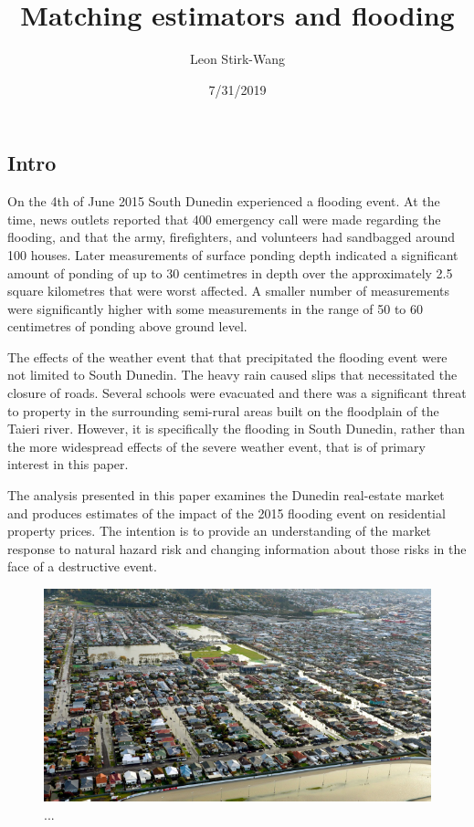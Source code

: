 \documentclass[]{article}
\title{Matching estimators and flooding}
\author{Leon Stirk-Wang}
\date{7/31/2019}
\begin{document}
\maketitle

\subsection{Intro}\label{intro}

On the 4th of June 2015 South Dunedin experienced a flooding event. At
the time, news outlets reported that 400 emergency call were made
regarding the flooding, and that the army, firefighters, and volunteers
had sandbagged around 100 houses. Later measurements of surface ponding
depth indicated a significant amount of ponding of up to 30 centimetres
in depth over the approximately 2.5 square kilometres that were worst
affected. A smaller number of measurements were significantly higher
with some measurements in the range of 50 to 60 centimetres of ponding
above ground level.

The effects of the weather event that that precipitated the flooding
event were not limited to South Dunedin. The heavy rain caused slips
that necessitated the closure of roads. Several schools were evacuated
and there was a significant threat to property in the surrounding
semi-rural areas built on the floodplain of the Taieri river. However,
it is specifically the flooding in South Dunedin, rather than the more
widespread effects of the severe weather event, that is of primary
interest in this paper.

The analysis presented in this paper examines the Dunedin real-estate
market and produces estimates of the impact of the 2015 flooding event
on residential property prices. The intention is to provide an
understanding of the market response to natural hazard risk and changing
information about those risks in the face of a destructive event.

\begin{figure}

{\centering \includegraphics[width=0.5\linewidth]{../images/flooding_4June2015} 

}

\caption{...}\label{fig:unnamed-chunk-1}
\end{figure}
\end{document}
